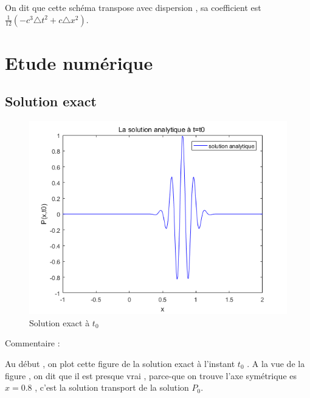 \documentclass[a4paper,10pt]{report} %
\begin{document}
 On dit que cette schéma transpose avec dispersion , sa coefficient est $\frac{1}{12}(-c^3\triangle t^2+c\triangle x^2)$.


\chapter{Etude numérique}

\section{Solution exact}
\begin{figure}[h]
\begin{center}
\includegraphics[width=1.0\textwidth]{FIG/figure1.png}
\end{center}
\caption{Solution exact à $t_0$ }
\label{figure1}
\end{figure}

Commentaire :

Au début , on plot cette figure de la solution exact à l'instant $t_0$ . A la vue de la figure , on dit que il est presque vrai , parce-que on trouve l'axe symétrique es$x=0.8$ , c'est la solution transport de la solution $P_0$.
\end{document}
